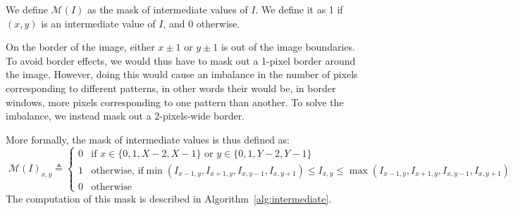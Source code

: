 \documentclass{ipol}
\begin{document}
We define $\mathcal M(I)$ as the mask of intermediate values of $I$. We define it as 1 if $(x, y)$ is an intermediate value of $I$, and $0$ otherwise.

On the border of the image, either $x\pm1$ or $y\pm1$ is out of the image boundaries. To avoid border effects, we would thus have to mask out a 1-pixel border around the image. However, doing this would cause an imbalance in the number of pixels corresponding to different patterns, in other words their would be, in border windows, more pixels corresponding to one pattern than another. To solve the imbalance, we instead mask out a 2-pixels-wide border.

More formally, the mask of intermediate values is thus defined as:
\[\phantom.\mathcal M(I)_{x, y} \triangleq \left\{\begin{array}{ll}
        0 &\text{if }x\in\{0, 1, X-2, X-1\}\text{ or }y\in\{0, 1, Y-2, Y-1\}\\
        1 &\text{otherwise, if}\min(I_{x-1, y}, I_{x+1, y}, I_{x, y-1}, I_{x, y+1}) \leq I_{x, y} \leq \max(I_{x-1, y}, I_{x+1, y}, I_{x, y-1}, I_{x, y+1})\\
0 &\text{otherwise}\end{array}\right.\]
The computation of this mask is described in Algorithm~\ref{alg:intermediate}.
\end{document}
